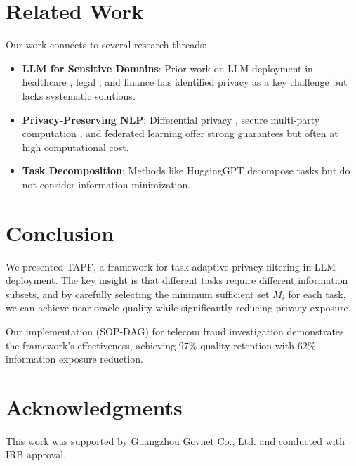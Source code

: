 \documentclass[letterpaper]{article}
\begin{document}
\section{Related Work}

Our work connects to several research threads:

\begin{itemize}
    \item \textbf{LLM for Sensitive Domains}: Prior work on LLM deployment in healthcare \citep{claire20healthcare}, legal \citep{alke14legal}, and finance \citep{bue21finance} has identified privacy as a key challenge but lacks systematic solutions.
    \item \textbf{Privacy-Preserving NLP}: Differential privacy \citep{yu22dp}, secure multi-party computation \citep{chen22smc}, and federated learning \citep{kairouz21fl} offer strong guarantees but often at high computational cost.
    \item \textbf{Task Decomposition}: Methods like HuggingGPT \citep{shen23hugginggpt} decompose tasks but do not consider information minimization.
\end{itemize}

\section{Conclusion}

We presented TAPF, a framework for task-adaptive privacy filtering in LLM deployment. The key insight is that different tasks require different information subsets, and by carefully selecting the minimum sufficient set $M_i$ for each task, we can achieve near-oracle quality while significantly reducing privacy exposure.

Our implementation (SOP-DAG) for telecom fraud investigation demonstrates the framework's effectiveness, achieving 97\% quality retention with 62\% information exposure reduction.

\section{Acknowledgments}

This work was supported by Guangzhou Govnet Co., Ltd. and conducted with IRB approval.



\end{document}
